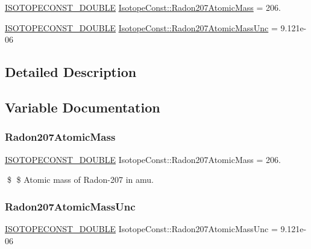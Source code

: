 \begin{DoxyCompactItemize}
\item 
\mbox{\hyperlink{group___isotope_const-_macros_ga8f45a7272ce02c0b4c65c44636ed719a}{I\+S\+O\+T\+O\+P\+E\+C\+O\+N\+S\+T\+\_\+\+D\+O\+U\+B\+LE}} \mbox{\hyperlink{group___isotope_const-_radon-_rn207_ga263b10226401b848fce8c30e83f8e373}{Isotope\+Const\+::\+Radon207\+Atomic\+Mass}} = 206.
\item 
\mbox{\hyperlink{group___isotope_const-_macros_ga8f45a7272ce02c0b4c65c44636ed719a}{I\+S\+O\+T\+O\+P\+E\+C\+O\+N\+S\+T\+\_\+\+D\+O\+U\+B\+LE}} \mbox{\hyperlink{group___isotope_const-_radon-_rn207_ga92dce645f4a908847e091eb0adb9a546}{Isotope\+Const\+::\+Radon207\+Atomic\+Mass\+Unc}} = 9.\+121e-\/06
\end{DoxyCompactItemize}


\subsection{Detailed Description}


\subsection{Variable Documentation}
\mbox{\label{group___isotope_const-_radon-_rn207_ga263b10226401b848fce8c30e83f8e373}} 
\subsubsection{\texorpdfstring{Radon207\+Atomic\+Mass}{Radon207AtomicMass}}
{\footnotesize\ttfamily \mbox{\hyperlink{group___isotope_const-_macros_ga8f45a7272ce02c0b4c65c44636ed719a}{I\+S\+O\+T\+O\+P\+E\+C\+O\+N\+S\+T\+\_\+\+D\+O\+U\+B\+LE}} Isotope\+Const\+::\+Radon207\+Atomic\+Mass = 206.}

\$ \$ Atomic mass of Radon-\/207 in amu. \mbox{\label{group___isotope_const-_radon-_rn207_ga92dce645f4a908847e091eb0adb9a546}} 
\subsubsection{\texorpdfstring{Radon207\+Atomic\+Mass\+Unc}{Radon207AtomicMassUnc}}
{\footnotesize\ttfamily \mbox{\hyperlink{group___isotope_const-_macros_ga8f45a7272ce02c0b4c65c44636ed719a}{I\+S\+O\+T\+O\+P\+E\+C\+O\+N\+S\+T\+\_\+\+D\+O\+U\+B\+LE}} Isotope\+Const\+::\+Radon207\+Atomic\+Mass\+Unc = 9.\+121e-\/06}

